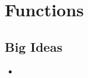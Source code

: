 \chapter{Functions}
\label{chap:F}

\section{Big Ideas}
\label{sec:F Big Ideas}
\begin{itemize}
  \item 
\end{itemize}